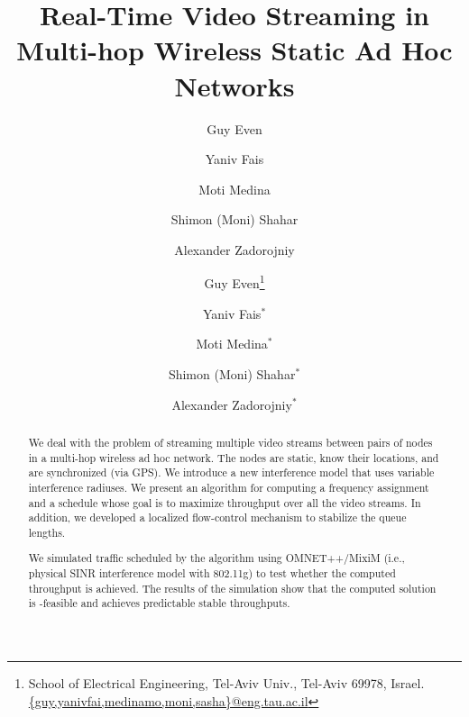 \documentclass[12pt]{article}
\newenvironment{proof sketch}[1]{\noindent {\emph{Proof sketch of #1:}}}{\hfill \qed}
\newcommand{\SINR}{\text{\sc{sinr}}}
\begin{document}
\title{Real-Time Video Streaming in Multi-hop Wireless Static Ad Hoc Networks}

\ifnum{}
\author{%
Guy Even
\and
Yaniv Fais
\and
Moti Medina
%
\and Shimon (Moni) Shahar
\and Alexander Zadorojniy}

\fi

\ifnum{}
\author{%
Guy Even\thanks{School of Electrical Engineering,
Tel-Aviv Univ., Tel-Aviv 69978, Israel.
\protect\url{{guy,yanivfai,medinamo,moni,sasha}@eng.tau.ac.il}}
\and
Yaniv Fais$^*$
\and
Moti Medina$^*$
%
\and Shimon (Moni) Shahar$^*$
\and Alexander Zadorojniy$^*$ }
\fi

\date{}

\maketitle



\begin{abstract}
  We deal with the problem of streaming multiple video streams between
  pairs of nodes in a multi-hop wireless ad hoc network.  The nodes
  are static, know their locations, and are synchronized (via GPS).  We introduce a new interference model that
  uses variable interference radiuses. We present an algorithm for
  computing a frequency assignment and a schedule whose goal is to
  maximize throughput over all the video streams.  In addition, we
  developed a localized flow-control mechanism to stabilize the queue
  lengths.

  We simulated traffic scheduled by the algorithm using OMNET++/MixiM
  (i.e., physical SINR interference model with 802.11g) to test
  whether the computed throughput is achieved. The results of the
  simulation show that the computed solution is \SINR-feasible and
  achieves predictable stable throughputs.
\end{abstract}

\end{document}
